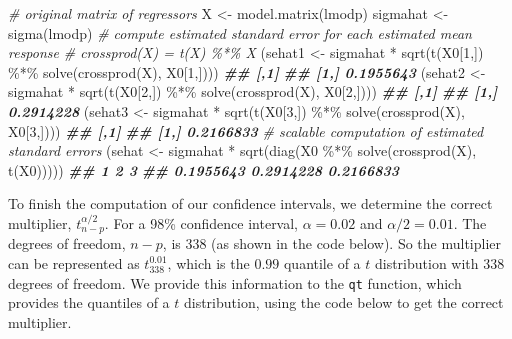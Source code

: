 \documentclass[
]{book}
\newenvironment{Shaded}{\begin{snugshade}}{\end{snugshade}}
\newcommand{\CommentTok}[1]{\textcolor[rgb]{0.56,0.35,0.01}{\textit{#1}}}
\newcommand{\DecValTok}[1]{\textcolor[rgb]{0.00,0.00,0.81}{#1}}
\newcommand{\DocumentationTok}[1]{\textcolor[rgb]{0.56,0.35,0.01}{\textbf{\textit{#1}}}}
\newcommand{\FunctionTok}[1]{\textcolor[rgb]{0.00,0.00,0.00}{#1}}
\newcommand{\NormalTok}[1]{#1}
\newcommand{\OtherTok}[1]{\textcolor[rgb]{0.56,0.35,0.01}{#1}}
\newcommand{\SpecialCharTok}[1]{\textcolor[rgb]{0.00,0.00,0.00}{#1}}
\theoremstyle{definition}
\theoremstyle{definition}
\theoremstyle{definition}
\theoremstyle{definition}
\theoremstyle{remark}
\begin{document}
\begin{Shaded}
\begin{Highlighting}[]
\CommentTok{\# original matrix of regressors}
\NormalTok{X }\OtherTok{\textless{}{-}} \FunctionTok{model.matrix}\NormalTok{(lmodp)}
\NormalTok{sigmahat }\OtherTok{\textless{}{-}} \FunctionTok{sigma}\NormalTok{(lmodp)}
\CommentTok{\# compute estimated standard error for each estimated mean response}
\CommentTok{\# crossprod(X) = t(X) \%*\% X}
\NormalTok{(sehat1 }\OtherTok{\textless{}{-}}\NormalTok{ sigmahat }\SpecialCharTok{*} \FunctionTok{sqrt}\NormalTok{(}\FunctionTok{t}\NormalTok{(X0[}\DecValTok{1}\NormalTok{,]) }\SpecialCharTok{\%*\%} \FunctionTok{solve}\NormalTok{(}\FunctionTok{crossprod}\NormalTok{(X), X0[}\DecValTok{1}\NormalTok{,])))}
\DocumentationTok{\#\#           [,1]}
\DocumentationTok{\#\# [1,] 0.1955643}
\NormalTok{(sehat2 }\OtherTok{\textless{}{-}}\NormalTok{ sigmahat }\SpecialCharTok{*} \FunctionTok{sqrt}\NormalTok{(}\FunctionTok{t}\NormalTok{(X0[}\DecValTok{2}\NormalTok{,]) }\SpecialCharTok{\%*\%} \FunctionTok{solve}\NormalTok{(}\FunctionTok{crossprod}\NormalTok{(X), X0[}\DecValTok{2}\NormalTok{,])))}
\DocumentationTok{\#\#           [,1]}
\DocumentationTok{\#\# [1,] 0.2914228}
\NormalTok{(sehat3 }\OtherTok{\textless{}{-}}\NormalTok{ sigmahat }\SpecialCharTok{*} \FunctionTok{sqrt}\NormalTok{(}\FunctionTok{t}\NormalTok{(X0[}\DecValTok{3}\NormalTok{,]) }\SpecialCharTok{\%*\%} \FunctionTok{solve}\NormalTok{(}\FunctionTok{crossprod}\NormalTok{(X), X0[}\DecValTok{3}\NormalTok{,])))}
\DocumentationTok{\#\#           [,1]}
\DocumentationTok{\#\# [1,] 0.2166833}
\CommentTok{\# scalable computation of estimated standard errors}
\NormalTok{(sehat }\OtherTok{\textless{}{-}}\NormalTok{ sigmahat }\SpecialCharTok{*} \FunctionTok{sqrt}\NormalTok{(}\FunctionTok{diag}\NormalTok{(X0 }\SpecialCharTok{\%*\%} \FunctionTok{solve}\NormalTok{(}\FunctionTok{crossprod}\NormalTok{(X), }\FunctionTok{t}\NormalTok{(X0)))))}
\DocumentationTok{\#\#         1         2         3 }
\DocumentationTok{\#\# 0.1955643 0.2914228 0.2166833}
\end{Highlighting}
\end{Shaded}

To finish the computation of our confidence intervals, we determine the correct multiplier, \(t_{n-p}^{\alpha/2}\). For a 98\% confidence interval, \(\alpha = 0.02\) and \(\alpha/2 = 0.01\). The degrees of freedom, \(n-p\), is 338 (as shown in the code below). So the multiplier can be represented as \(t_{338}^{0.01}\), which is the \(0.99\) quantile of a \(t\) distribution with 338 degrees of freedom. We provide this information to the \texttt{qt} function, which provides the quantiles of a \(t\) distribution, using the code below to get the correct multiplier.
\end{document}
